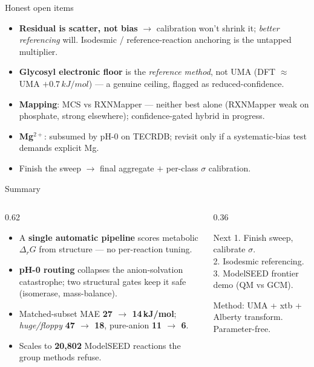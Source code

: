 \documentclass[aspectratio=169,11pt]{beamer}
\newcommand{\kj}{\,kJ/mol}
\newcommand{\arw}{$\rightarrow$}
\begin{document}
\begin{frame}{Honest open items}
  \begin{itemize}
    \item \textbf{Residual is scatter, not bias} \arw{} calibration won't shrink it; \emph{better referencing} will.
    Isodesmic / reference-reaction anchoring is the untapped multiplier.
    \item \textbf{Glycosyl electronic floor} is the \emph{reference method}, not UMA (DFT $\approx$ UMA $+0.7\kj$) — a genuine ceiling, flagged as reduced-confidence.
    \item \textbf{Mapping}: MCS vs RXNMapper — neither best alone (RXNMapper weak on phosphate, strong elsewhere); confidence-gated hybrid in progress.
    \item \textbf{Mg$^{2+}$}: subsumed by pH-0 on TECRDB; revisit only if a systematic-bias test demands explicit Mg.
    \item Finish the sweep \arw{} final aggregate $+$ per-class $\sigma$ calibration.
  \end{itemize}
\end{frame}

\begin{frame}{Summary}
  \begin{columns}[T]
    \begin{column}{0.62\textwidth}
      \begin{itemize}
        \item A \textbf{single automatic pipeline} scores metabolic $\Delta_r G$ from structure — no per-reaction tuning.
        \item \textbf{pH-0 routing} collapses the anion-solvation catastrophe; two structural gates keep it safe (isomerase, mass-balance).
        \item Matched-subset MAE \textbf{27 \arw{} 14\kj}; \emph{huge/floppy} \textbf{47 \arw{} 18}, pure-anion \textbf{11 \arw{} 6}.
        \item Scales to \textbf{20{,}802} ModelSEED reactions the group methods refuse.
      \end{itemize}
    \end{column}
    \begin{column}{0.36\textwidth}
      \begin{block}{Next}
        \footnotesize
        1. Finish sweep, calibrate $\sigma$.\\
        2. Isodesmic referencing.\\
        3. ModelSEED frontier demo (QM vs GCM).
      \end{block}
      \vspace{0.5em}
      {\scriptsize\color{brandgray} Method: UMA + xtb + Alberty transform. Parameter-free.}
    \end{column}
  \end{columns}
  \vfill
\end{frame}
\end{document}
